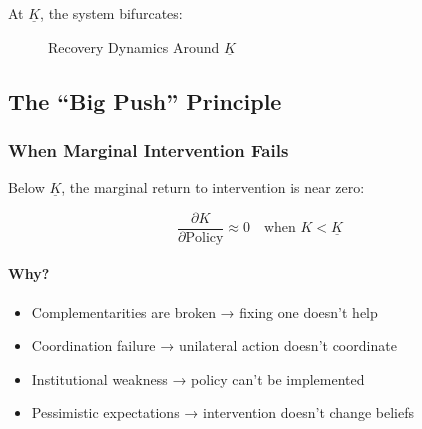At $\underline{K}$, the system bifurcates:

\begin{figure}[htbp]
\centering
\caption{Recovery Dynamics Around $\underline{K}$}
\label{fig:bifurcation}
\begin{center}
\end{center}
\end{figure}

\subsection{The ``Big Push'' Principle}

\subsubsection{When Marginal Intervention Fails}

Below $\underline{K}$, the marginal return to intervention is near zero:

\begin{equation}
\frac{\partial K}{\partial \text{Policy}} \approx 0 \quad \text{when } K < \underline{K}
\end{equation}

\paragraph{Why?}
\begin{itemize}
    \item Complementarities are broken → fixing one doesn't help
    \item Coordination failure → unilateral action doesn't coordinate
    \item Institutional weakness → policy can't be implemented
    \item Pessimistic expectations → intervention doesn't change beliefs
\end{itemize}

